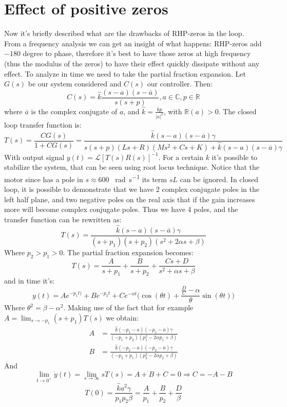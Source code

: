 \section{Effect of positive zeros}
Now it's briefly described what are the drawbacks of RHP-zeros in the loop. From  a frequency analysis we can get an insight of what happens: RHP-zeros add  $-180$ degree to phase, therefore it's best to have those zeros at high frequency (thus the modulus of the zeros) to have their effect quickly dissipate without any effect. To analyze in time we need to take the partial 	fraction expansion. Let $G(s)$ be our system considered and $C(s)$ our controller. Then:
$$C(s) = \hat{k}\frac{(s-a)(s-\overline{a})}{s(s+p)}, a \in \mathbb{C}, p \in \mathbb{R}$$
where $\overline{a}$ is the complex conjugate of $a$, and $\hat{k}=\frac{kp}{|a|^2}$, with $\mathbb{R}(a) > 0$. 
The closed loop transfer function is:
$$T(s) = \frac{CG(s)}{1+CG(s)} = \frac{\hat{k}(s-a)(s-\overline{a})\gamma}{s(s+p)(Ls+R)(Ms^2+Cs+K)+\hat{k}(s-a)(s-\overline{a})\gamma}$$
With output signal $y(t) = \mathcal{L}[T(s)R(s)]^{-1}$.
For a certain $k$ it's possible to stabilize the system, that can be seen using root locus technique.
Notice that the motor since has a pole in $s \approx 600$ \SI{}{\radian \per \second} its term $sL$ can be ignored. In closed loop, it is possible to demonstrate that we have 2 complex conjugate poles in the left half plane, and two negative poles on the real axis that if the gain increases more will become complex conjugate poles. Thus we have 4 poles, and the transfer function can be rewritten as:
$$T(s) = \frac{\hat{k}(s-a)(s-\overline{a})\gamma}{(s+p_{1})(s+p_{2})(s^2+2\alpha s+\beta)}
$$
Where $p_2>p_1 >0 $. The partial fraction expansion becomes:
$$T(s) = \frac{A}{s+p_1} + \frac{B}{s+p_2} +\frac{Cs+D}{s^2+\alpha s+\beta}$$
and in time it's:
$$y(t) = Ae^{-p_1 t)}+ Be^{-p_2 t} +Ce^{-\alpha t}\Big (\cos(\theta t)+ \frac{\frac{D}{C}-\alpha}{\theta} \sin(\theta t) \Big)$$
Where $\theta^2 =  \beta -\alpha^2$. 
Making use of the fact that for example $A = \lim_{s \to -p_1} (s+p_1)T(s)$ we obtain:
\begin{align*}A &= \frac{\hat{k}(-p_1-a)(-p_1-\overline{a})\gamma}{(-p_1+p_2)(p_1^2-2\alpha p_1+\beta)}\\
B &= \frac{\hat{k}(-p_2-a)(-p_2-\overline{a})\gamma}{(-p_2+p_1)(p_2^2-2\alpha p_2+\beta)}
\end{align*}
And $$\lim_{t \to 0^{+}} \dot{y}(t) = \lim_{s \to \infty} sT(s) = A+B+C=0 \Rightarrow C=-A-B$$
$$T(0)= \frac{\hat{k}a^2\gamma}{p_1 p_2 \beta } = \frac{A}{p_1} + \frac{B}{p_2} + \frac{D}{\beta}$$
